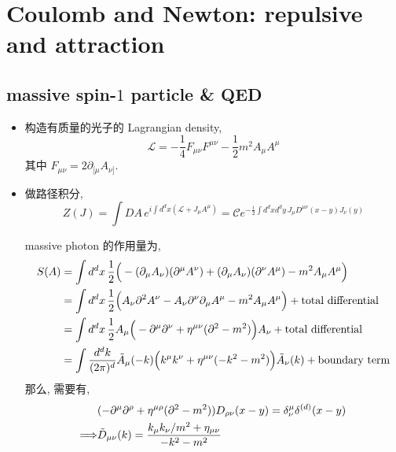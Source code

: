 \chapter{Coulomb and Newton: repulsive and attraction}
\section{massive spin-\texorpdfstring{$1$}{1} particle \& QED}
\begin{itemize}
	\item 构造有质量的光子的 Lagrangian density,
	\begin{equation} \label{3.1.1}
		\mathcal{L} = - \frac{1}{4} F_{\mu \nu} F^{\mu \nu} - \frac{1}{2} m^2 A_\mu A^\mu
	\end{equation}
	其中 $F_{\mu \nu} = 2 \partial_{[\mu} A_{\nu]}$.
	
	\item 做路径积分,
	\begin{equation}
		Z(J) = \int DA \, e^{i \int d^d x (\mathcal{L} + J_\mu A^\mu)} = \mathcal{C} e^{- \frac{i}{2} \int d^d x d^d y \, J_\mu D^{\mu \nu}(x - y) J_\nu(y)}
	\end{equation}
	
	\begin{tcolorbox}[title=calculation:]
		massive photon 的作用量为,
		\begin{align}
			S(A) &= \int d^d x \, \frac{1}{2} \Big( - (\partial_\mu A_\nu) (\partial^\mu A^\nu) + (\partial_\mu A_\nu) (\partial^\nu A^\mu) - m^2 A_\mu A^\mu \Big) \notag \\
			&= \int d^d x \, \frac{1}{2} \Big( A_\nu \partial^2 A^\nu - A_\nu \partial^\nu \partial_\mu A^\mu - m^2 A_\mu A^\mu \Big) + \text{total differential} \notag \\
			&= \int d^d x \, \frac{1}{2} A_\mu \Big( - \partial^\mu \partial^\nu + \eta^{\mu \nu} (\partial^2 - m^2) \Big) A_\nu + \text{total differential} \notag \\
			&= \int \frac{d^d k}{(2 \pi)^d} \tilde{A}_\mu(- k) \Big( k^\mu k^\nu + \eta^{\mu \nu} (- k^2 - m^2) \Big) \tilde{A}_\nu(k) + \text{boundary term}
		\end{align}
		那么, 需要有,
		\begin{align}
			& (- \partial^\mu \partial^\rho + \eta^{\mu \rho} (\partial^2 - m^2)) D_{\rho \nu}(x - y) = \delta^\mu_\nu \delta^{(d)}(x - y) \notag \\
			\Longrightarrow & \tilde{D}_{\mu \nu}(k) = \frac{k_\mu k_\nu / m^2 + \eta_{\mu \nu}}{- k^2 - m^2}
		\end{align}
	\end{tcolorbox}
	

\end{itemize}
